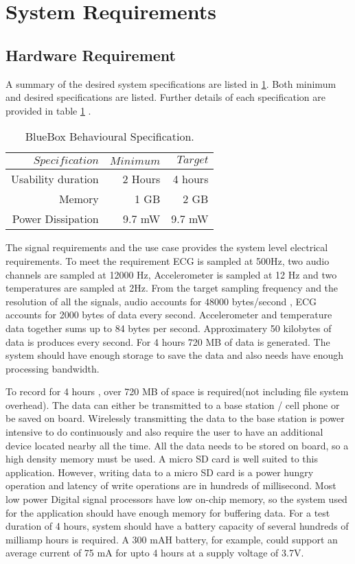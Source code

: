 \section{System Requirements}\label{system requirements}
\subsection{Hardware Requirement}

\hspace{10mm}A summary of the desired system specifications are listed in \ref{table:Behavioural_specs}. Both minimum and desired specifications are listed. Further details of each specification are provided in table \ref{table:Behavioural_specs} .
\begin{table}[h]
	\centering
	\begin{tabular}{|r |r|r|}
		\hline
		$Specification$ & $Minimum$ & $Target$ \\
		\hline
		Usability duration  &  2 Hours & 4 hours \\
		Memory & 1 GB & 2 GB \\
		Power Dissipation & 9.7 mW & 9.7 mW \\
		\hline
	\end{tabular}
	\caption{BlueBox Behavioural Specification.}
	\label{table:Behavioural_specs}
\end{table}

The signal requirements and the use case  provides the system level electrical requirements.  To meet the requirement ECG is sampled at 500Hz, two audio channels are sampled at 12000 Hz, Accelerometer is sampled at 12 Hz and two temperatures are sampled at 2Hz. From the target sampling frequency and the resolution of all the signals, audio accounts for 48000 bytes/second , ECG accounts for 2000 bytes of data every second. Accelerometer and temperature data together sums up to 84 bytes per second. Approximatery 50 kilobytes of data is produces every second. For 4 hours 720 MB of data is generated. The system should have enough storage to save the data and also needs have enough processing bandwidth. 

\hspace{10mm} To record for 4 hours , over 720 MB of space is required(not including file system overhead). The data can either be transmitted to a base station / cell phone or be saved on board. Wirelessly transmitting the data to the base station is power intensive to do continuously and also require the user to have an additional device located nearby all the time. 
All the data needs to be stored on board, so a high density memory must be used. A micro SD card is well suited to this application. However, writing data to a micro SD card is a power hungry operation and latency of write operations are in hundreds of millisecond. Most low power Digital signal processors have low on-chip memory, so the system used for the application should have enough memory for buffering data. For a test duration of 4 hours, system should have a battery capacity of several hundreds of milliamp hours is required. A 300 mAH battery, for example, could support an average current of 75 mA for upto 4 hours at a supply voltage of 3.7V. 

